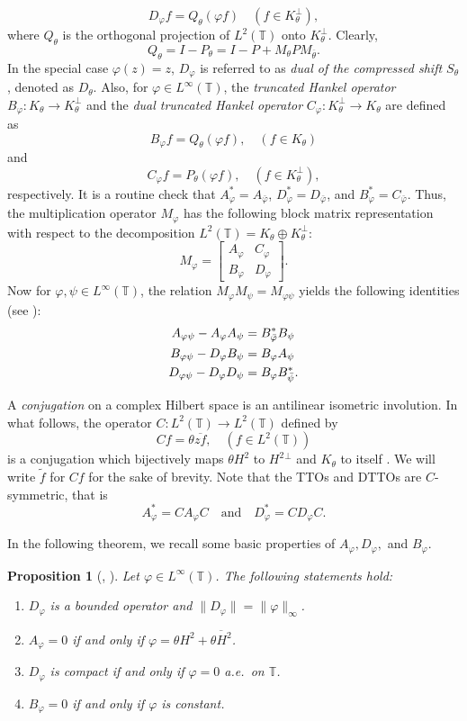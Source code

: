 \documentclass[12pt]{amsart}
\newcommand{\T}{\mathbb{T}}
\newcommand{\h}{{H}^2}
\theoremstyle{definition}
\theoremstyle{plain}
\newtheorem{prop}[thm]{Proposition}
\theoremstyle{definition}
\numberwithin{equation}{section}
\let\phi=\varphi
\begin{document}
	\[
	{D_\phi}f= Q_\theta(\phi f) \quad (f \in K_\theta^\perp),
	\]
where $Q_\theta$ is the orthogonal projection of $L^2(\T)$ onto $K_\theta^\perp$.  
Clearly,
	\[
	Q_\theta=I-P_\theta=I-P+ M_\theta PM_{\overline{\theta}}.
	\]
In the special case $\phi(z)=z$, $D_\phi$ is referred to as \textit{dual of the compressed shift $S_\theta$}, denoted as $D_\theta$. Also, for $\phi \in L^\infty(\T)$, the \textit{truncated Hankel operator} $B_\phi: K_\theta \rightarrow K_\theta^\perp$ and the \textit{dual truncated Hankel operator} $C_\phi: K_\theta^\perp \rightarrow K_\theta$ are defined as
	\[
	B_\phi f= Q_\theta(\phi f), \quad (f \in K_\theta)
	\]
and
	\[
	C_\phi f=P_\theta(\phi f), \quad (f \in K_\theta^\perp),
	\]
respectively. It is a routine check that $A_\phi^*=A_{\bar{\phi}}$, $D_{\phi}^*=D_{\bar{\phi}}$, and $B_\phi^*=C_{\bar{\phi}}$.	
Thus, the multiplication operator $M_{\phi}$ has the following block matrix representation with respect to the decomposition $L^2(\T)=K_{\theta}\oplus K_{\theta}^{\perp}$:
	\[
	M_{\phi}=
	\begin{bmatrix}
		A_{\phi} & C_{\phi}\\
		B_{\phi} & D_{\phi}
	\end{bmatrix}.
	\]
Now for $\phi, \psi\in L^{\infty}(\T)$, the relation $M_{\phi}M_{\psi}=M_{\phi\psi}$ yields the following identities (see \cite{XD}):
\begin{align}
		A_{\phi\psi}-A_{\phi}A_{\psi} &= B_{\Bar{\phi}}^*B_{\psi}\label{Eq:relation between A and B}\\
		B_{\phi\psi}-D_{\phi}B_{\psi} &= B_{\phi}A_{\psi} \label{Eq:relation between A B and D}\\
		D_{\phi\psi}-D_{\phi}D_{\psi} &= B_{\phi}B_{\Bar{\psi}}^* \label{Eq:relation between D and B}.	
\end{align}
	
	
A \textit{conjugation} on a complex Hilbert space is an antilinear isometric involution. In what follows, the operator $C: L^2(\T) \rightarrow L^2(\T)$ defined by
	\[
	Cf=\theta \overline{zf}, \quad (f \in L^2(\T))
	\]
is a conjugation which bijectively maps $\theta \h$ to $\h{}^\perp$ and $K_\theta$ to itself \cite{GM}. We will write $\tilde{f}$ for $Cf$ for the sake of brevity. Note that the TTOs and DTTOs are $C$-symmetric, that is 
	\[
	A_\phi^*=CA_\phi C \quad \text{and} \quad D_\phi^*= C D_\phi C.
	\]
	
In the following theorem, we recall some basic properties of $A_{\phi}, D_{\phi},$ and $B_{\phi}$.
	
\begin{prop}[\cite{XD}, \cite{KLN}]
Let $\phi \in L^\infty(\T)$. The following statements hold:
\begin{enumerate}
			\item $D_\phi$ is a bounded operator and $\|D_\phi\|=\|\phi\|_\infty$.
			\item $A_\phi=0$ if and only if $\phi=\theta \h +\overline{\theta \h}$.
			\item $D_\phi$ is compact if and only if $\phi=0$ a.e.\ on $\T$.
			\item $B_\phi=0$ if and only if $\phi$ is constant.	
		\end{enumerate}
\end{prop}
	
\end{document}
